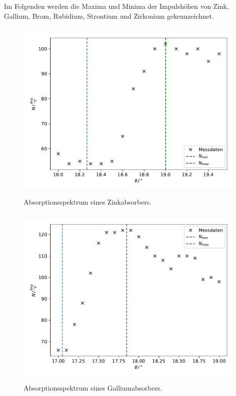 \noindent
Im Folgenden werden die Maxima und Minima der Impulshöhen von Zink, Gallium, Brom, Rubidium, Strontium  und Zirkonium gekennzeichnet.

\begin{figure}
    \centering
       \includegraphics[height=9cm]{daten/zink.pdf}
       \caption{Absorptionsspektrum eines Zinkabsorbers.}
       \label{fig:zink}
\end{figure}

\begin{figure}
    \centering
       \includegraphics[height=9cm]{daten/gallium.pdf}
       \caption{Absorptionsspektrum eines Galliumabsorbers.}
       \label{fig:gallium}
\end{figure}

